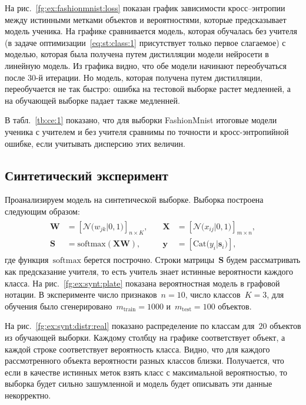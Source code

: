 \documentclass[12pt]{a&t}
\begin{document}
На рис.~\ref{fg:ex:fashionmnist:loss} показан график зависимости кросс--энтропии между истинными метками объектов и вероятностями, которые предсказывает модель ученика. На графике сравнивается модель, которая обучалась без учителя (в задаче оптимизации~\eqref{eq:st:class:1} присутствует только первое слагаемое) с моделью, которая была получена путем дистилляции модели нейросети в линейную модель. Из графика видно, что обе модели начинают переобучаться после 30-й итерации. Но модель, которая получена путем дистилляции, переобучается не так быстро: ошибка на тестовой выборке растет медленней, а на обучающей выборке падает также медленней.

В табл.~\ref{tb:ce:1} показано, что для выборки FashionMnist итоговые модели ученика с учителем и без учителя сравнимы по точности и кросс-энтропийной ошибке, если учитывать дисперсию этих величин.

\subsection{Синтетический эксперимент}
Проанализируем модель на синтетической выборке. Выборка построена следующим образом:
\begin{gather}
\begin{aligned}
\mathbf{W} &= \left[\mathcal{N}\bigr(w_{jk}|0, 1\bigr)\right]_{n\times K}, \quad &\mathbf{X} &= \left[\mathcal{N}\bigr(x_{ij}|0, 1\bigr)\right]_{m\times n}, \\
 \mathbf{S} &= \text{softmax}\left(\mathbf{XW}\right), \quad &\mathbf{y} &= \left[\text{Cat}\bigr(y_i| \mathbf{s}_i\bigr)\right],
\end{aligned}
\end{gather}
где функция~$\text{softmax}$ берется построчно. Строки матрицы~$\mathbf{S}$ будем рассматривать как предсказание учителя, то есть учитель знает истинные вероятности каждого класса. На рис.~\ref{fg:ex:synt:plate} показана вероятностная модель в графовой нотации. В эксперименте число признаков~$n=10$, число классов~$K=3$, для обучения было сгенерировано~$m_{\text{train}}=1000$ и~$m_{\text{test}}=100$ объектов.

На рис.~\ref{fg:ex:synt:distr:real} показано распределение по классам для~$20$ объектов из обучающей выборки. Каждому столбцу на графике соответствует объект, а каждой строке соответствует вероятность класса. Видно, что для каждого рассмотренного объекта вероятности разных классов близки. Получается, что если в качестве истинных меток взять класс с максимальной вероятностью, то выборка будет сильно зашумленной и модель будет описывать эти данные некорректно.
\end{document}
